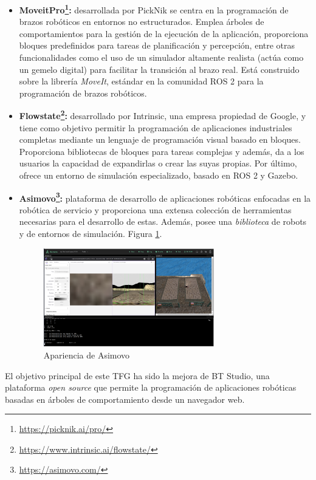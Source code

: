 \begin{itemize}
    \item \textbf{MoveitPro\footnote{\url{https://picknik.ai/pro/}}:} desarrollada por PickNik se centra en la programación de brazos robóticos en entornos no estructurados. Emplea árboles de comportamientos para la gestión de la ejecución de la aplicación, proporciona bloques predefinidos para tareas de planificación y percepción, entre otras funcionalidades como el uso de un simulador altamente realista (actúa como un gemelo digital) para facilitar la transición al brazo real. Está construido sobre la librería \textit{MoveIt}, estándar en la comunidad ROS 2 para la programación de brazos robóticos. 
    \item \textbf{Flowstate\footnote{\url{https://www.intrinsic.ai/flowstate/}}:} desarrollado por Intrinsic, una empresa propiedad de Google, y tiene como objetivo permitir la programación de aplicaciones industriales completas mediante un lenguaje de programación visual basado en bloques. Proporciona bibliotecas de bloques para tareas complejas y además, da a los usuarios la capacidad de expandirlas o crear las suyas propias. Por último, ofrece un entorno de simulación especializado, basado en ROS 2 y Gazebo.
    \item \textbf{Asimovo\footnote{\url{https://asimovo.com/}}:} plataforma de desarrollo de aplicaciones robóticas enfocadas en la robótica de servicio y proporciona una extensa colección de herramientas necesarias para el desarrollo de estas. Además, posee una \textit{biblioteca} de robots y de entornos de simulación. Figura \ref{fig:asimovo}.
    \begin{figure}[H]
        \centering
        \includegraphics[width=0.7\textwidth]{figures/intro/asimovo.png}
        \caption{Apariencia de Asimovo}
        \label{fig:asimovo}
    \end{figure}
\end{itemize}

El objetivo principal de este TFG ha sido la mejora de BT Studio, una plataforma \textit{open source} que permite 
la programación de aplicaciones robóticas basadas en árboles de comportamiento desde un navegador web. 

